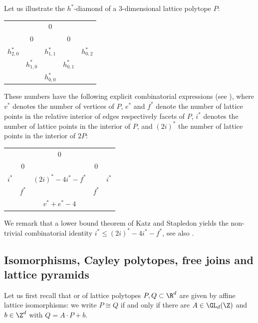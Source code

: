 \documentclass[reqno, 11pt, a4paper, oneside]{amsart}
\begin{document}
\begin{ex}
Let us illustrate the $h^*$-diamond of a $3$-dimensional lattice polytope $P$:

\begin{center}
\begin{tabular}{ccccc}
& & 0 & &\\
& 0 && 0 &\\
$h^*_{2,0}$ && $h^*_{1,1}$ && $h^*_{0,2}$\\
& $h^*_{1,0} $& & $h^*_{0,1}$&\\
&&$h^*_{0,0}$&&
\end{tabular}
\end{center}

These numbers have the following explicit combinatorial expressions (see \cite[Example~8.9]{katz_local_2016}), where $v^*$ denotes the number of vertices of $P$, $e^*$ and $f^*$ denote the number of lattice points in the relative interior of edges respectively facets of $P$, $i^*$ denotes the number of lattice points in the interior of $P$, and $(2i)^*$ the number of lattice points in the interior of $2P$:

\begin{center}
\begin{tabular}{ccccc}
& & 0 & &\\
& 0 && 0 &\\
$i^*$ && $(2i)^*\!\!-\!4i^*\!\!-\!f^*$ && $i^*$\\
& $f^*$ & & $f^*$&\\
&&$v^*\!\!+\!e^*\!\!-\!4$&&
\end{tabular}
\end{center}
\end{ex}

We remark that a lower bound theorem of Katz and Stapledon \cite[p.~184]{katz_local_2016} yields the non-trivial combinatorial identity $i^* \le (2i)^*-4i^*-f^*$, see also \cite[Cor.~4.6]{borger_thin_2023}.

\subsection{Isomorphisms, Cayley polytopes, free joins and lattice pyramids}
\label{subsec:Cayley}
Let us first recall that  or  of lattice polytopes $P,Q \subset \R^d$ are given by affine lattice isomorphisms: we write $P \cong Q$ if and only if there are $A \in \GL_d(\Z)$ and $b \in \Z^d$ with $Q = A \cdot P + b$.
\end{document}
